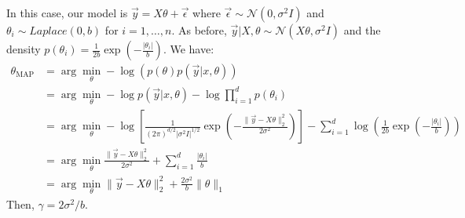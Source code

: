\begin{answer}
In this case, our model is $\vec{y} = X\theta + \vec{\epsilon}$ where $ \vec{\epsilon} \sim \mathcal{N}(0,\sigma^2 I) $ and $ \theta_i \sim \textit{Laplace}(0,b) $ for $i=1,\dots,n$. As before, $\vec{y}|X,\theta \sim \mathcal{N}(X\theta,\sigma^2 I)$ and the density $p(\theta_i) = \frac{1}{2b} \exp\left( -\frac{|\theta_i|}{b} \right)$. We have:
\begin{align}
	\theta_{\text{MAP}}
	&= \arg\min_{\theta} -\log(p(\theta) p(\vec{y}|x,\theta)) \\
	&= \arg\min_{\theta} -\log p(\vec{y}|x,\theta) - \log \prod_{i=1}^{d} p(\theta_i) \\
	&= \arg\min_{\theta} -\log \left[ \frac{1}{(2\pi)^{d/2}|\sigma^2 I|^{1/2}} \exp \left( -\frac{\|\vec{y} - X\theta\|_2^2}{2\sigma^2} \right) \right] - \sum_{i=1}^{d} \log \left( \frac{1}{2b} \exp\left( -\frac{|\theta_i|}{b} \right) \right) \\
	&= \arg\min_{\theta} \frac{\|\vec{y} - X\theta\|_2^2}{2\sigma^2} + \sum_{i=1}^{d} \frac{|\theta_i|}{b} \\
	&= \arg\min_{\theta} \|\vec{y} - X\theta\|_2^2 + \frac{2\sigma^2}{b} \|\theta\|_1
\end{align}
Then, $\gamma = 2\sigma^2/b$. \\
\end{answer}

